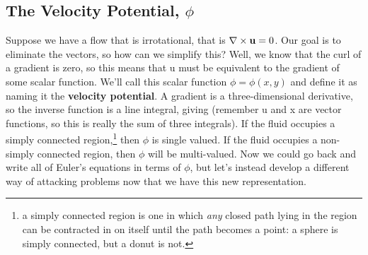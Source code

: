 \documentclass[12pt]{book}
\begin{document}
\subsection{The Velocity Potential, $\phi$}
Suppose we have a flow that is irrotational, that is $\curl\vec u = 0$.  Our goal is to eliminate the vectors, so how can we simplify this?  Well, we know that the curl of a gradient is zero, so this means that \vec u must be equivalent to the gradient of some scalar function.  We'll call this scalar function $\phi = \phi(x,y)$ and define it as
naming it the \textbf{velocity potential}.  A gradient is a three-dimensional derivative, so the inverse function is a line integral, giving
(remember \vec u and \vec x are vector functions, so this is really the sum of three integrals).  If the fluid occupies a simply connected region,\footnote{a simply connected region is one in which \textit{any} closed path lying in the region can be contracted in on itself until the path becomes a point:  a sphere is simply connected, but a donut is not.}  then $\phi$ is single valued.  If the fluid occupies a non-simply connected region, then $\phi$ will be multi-valued.
Now we could go back and write all of Euler's equations in terms of $\phi$, but let's instead develop a different way of attacking problems now that we have this new representation.
\end{document}
